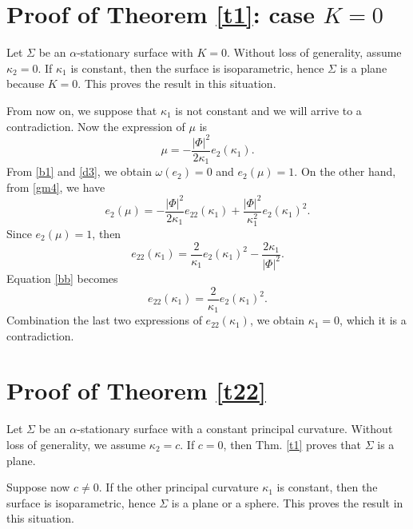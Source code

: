 \documentclass[a4paper,12pt]{amsart}
\theoremstyle{definition}
\begin{document}
  
 
\section{Proof of Theorem \ref{t1}: case $K=0$}\label{s4}

Let $\Sigma$ be an $\alpha$-stationary surface with $K=0$.   Without loss of generality, assume   $\kappa_2=0$. If $\kappa_1$ is constant,  then the surface is isoparametric, hence $\Sigma$ is a plane because $K=0$. This proves the result in this situation.
 
From now on, we suppose that $\kappa_1$ is not constant and we will arrive to a contradiction. Now the expression of $\mu$ is \begin{equation}\label{gm4}
\mu=-\frac{|\Phi|^2}{2\kappa_1}e_2(\kappa_1).
\end{equation}
  From \eqref{b1} and   \eqref{d3}, we obtain $\omega(e_2)=0$  and $e_2(\mu)=1$.   On the other hand, from \eqref{gm4}, we have 
\begin{equation*}
e_2(\mu)=-\frac{|\Phi|^2}{2\kappa_1}e_{22}(\kappa_1)+\frac{|\Phi|^2}{\kappa_1^2}e_2(\kappa_1)^2.
  \end{equation*}
  Since $e_2(\mu)=1$, then
  $$e_{22}(\kappa_1)=\frac{2}{\kappa_1} e_2(\kappa_1)^2-\frac{2 \kappa_1}{|\Phi|^2}.$$
 Equation \eqref{bb} becomes 
  $$e_{22}(\kappa_1)=\frac{2}{\kappa_1}e_2(\kappa_1)^2.$$
Combination the last two expressions of $e_{22}(\kappa_1)$, we obtain $\kappa_1=0$, which it is a contradiction. 
 
 
\section{Proof of Theorem \ref{t22}}\label{s5}
 
 Let $\Sigma$ be an $\alpha$-stationary surface with a constant principal curvature.    Without loss of generality, we assume   $\kappa_2=c$. If $c=0$, then Thm. \ref{t1} proves that $\Sigma$ is a plane. 
 
 Suppose now $c\not=0$. If the other principal curvature $\kappa_1$ is constant,  then the surface is isoparametric, hence $\Sigma$ is a plane or a sphere. This proves the result in this situation. 
 
\end{document}
